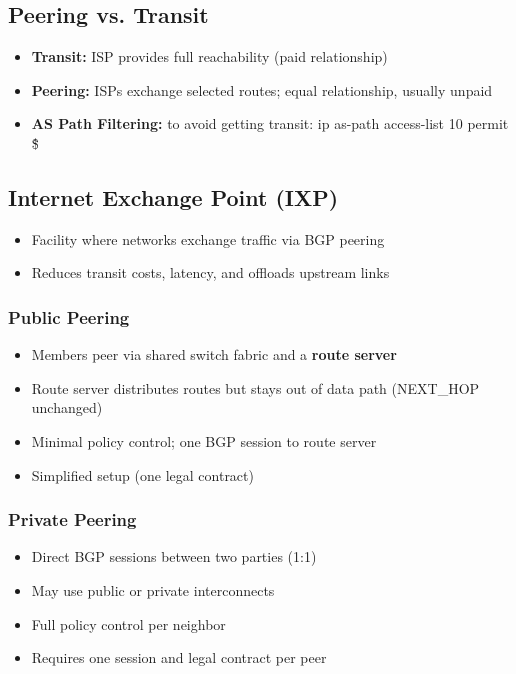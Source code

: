 \begin{multicols*}{5}
		\subsection{Peering vs. Transit}
		\begin{itemize}
			\item \textbf{Transit:} ISP provides full reachability (paid relationship)
			\item \textbf{Peering:} ISPs exchange selected routes; equal relationship, usually unpaid
			\item \textbf{AS Path Filtering:} to avoid getting transit:	 ip as-path access-list 10 permit \^ \$
		\end{itemize}
		
		\subsection{Internet Exchange Point (IXP)}
		\begin{itemize}
			\item Facility where networks exchange traffic via BGP peering
			\item Reduces transit costs, latency, and offloads upstream links
		\end{itemize}
		
		\subsubsection*{Public Peering}
		\begin{itemize}
			\item Members peer via shared switch fabric and a \textbf{route server}
			\item Route server distributes routes but stays out of data path (NEXT\_HOP unchanged)
			\item Minimal policy control; one BGP session to route server
			\item Simplified setup (one legal contract)
		\end{itemize}
		
		\subsubsection*{Private Peering}
		\begin{itemize}
			\item Direct BGP sessions between two parties (1:1)
			\item May use public or private interconnects
			\item Full policy control per neighbor
			\item Requires one session and legal contract per peer
		\end{itemize}
		

\end{multicols*}
